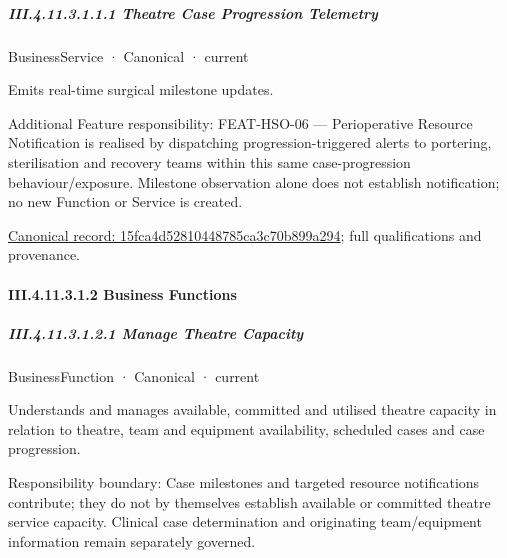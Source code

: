 \subparagraph*{III.4.11.3.1.1.1 Theatre Case Progression Telemetry}
\label{navigation:III.4.11.3.1.1.1}

\label{element:15fca4d52810448785ca3c70b899a294}
{\small BusinessService · Canonical · current}\par

Emits real-time surgical milestone updates.



Additional Feature responsibility: FEAT-HSO-06 — Perioperative Resource Notification is realised by dispatching progression-triggered alerts to portering, sterilisation and recovery teams within this same case-progression behaviour/exposure. Milestone observation alone does not establish notification; no new Function or Service is created.


{\footnotesize \href{../../../../continuum/business/business-service/15fca4d52810448785ca3c70b899a294.md}{Canonical record: 15fca4d52810448785ca3c70b899a294}; full qualifications and provenance.}\par
\paragraph*{III.4.11.3.1.2 Business Functions}
\label{navigation:III.4.11.3.1.2}

\subparagraph*{III.4.11.3.1.2.1 Manage Theatre Capacity}
\label{navigation:III.4.11.3.1.2.1}

\label{element:3566d549770f490dba823fe3b0421446}
{\small BusinessFunction · Canonical · current}\par

Understands and manages available, committed and utilised theatre capacity in relation to theatre, team and equipment availability, scheduled cases and case progression.



Responsibility boundary: Case milestones and targeted resource notifications contribute; they do not by themselves establish available or committed theatre service capacity. Clinical case determination and originating team/equipment information remain separately governed.


